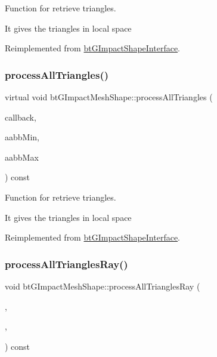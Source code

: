 Function for retrieve triangles. 

It gives the triangles in local space 

Reimplemented from \hyperlink{classbtGImpactShapeInterface_ae1dc14b29f49fc0262be72dbe9d7b75b}{bt\+G\+Impact\+Shape\+Interface}.

\mbox{\label{classbtGImpactMeshShape_aee93cb18d43817c183fa662d9e7b32e5}} 
\subsubsection{\texorpdfstring{process\+All\+Triangles()}{processAllTriangles()}\hspace{0.1cm}{\footnotesize\ttfamily [2/2]}}
{\footnotesize\ttfamily virtual void bt\+G\+Impact\+Mesh\+Shape\+::process\+All\+Triangles (\begin{DoxyParamCaption}\item[{\hyperlink{classbtTriangleCallback}{bt\+Triangle\+Callback} $\ast$}]{callback,  }\item[{const bt\+Vector3 \&}]{aabb\+Min,  }\item[{const bt\+Vector3 \&}]{aabb\+Max }\end{DoxyParamCaption}) const\hspace{0.3cm}{\ttfamily [virtual]}}



Function for retrieve triangles. 

It gives the triangles in local space 

Reimplemented from \hyperlink{classbtGImpactShapeInterface_ae1dc14b29f49fc0262be72dbe9d7b75b}{bt\+G\+Impact\+Shape\+Interface}.

\mbox{\label{classbtGImpactMeshShape_ab7221f209f9d10d2f1eb80cca5aee55d}} 
\subsubsection{\texorpdfstring{process\+All\+Triangles\+Ray()}{processAllTrianglesRay()}\hspace{0.1cm}{\footnotesize\ttfamily [1/2]}}
{\footnotesize\ttfamily void bt\+G\+Impact\+Mesh\+Shape\+::process\+All\+Triangles\+Ray (\begin{DoxyParamCaption}\item[{\hyperlink{classbtTriangleCallback}{bt\+Triangle\+Callback} $\ast$}]{,  }\item[{const bt\+Vector3 \&}]{,  }\item[{const bt\+Vector3 \&}]{ }\end{DoxyParamCaption}) const\hspace{0.3cm}{\ttfamily [virtual]}}



